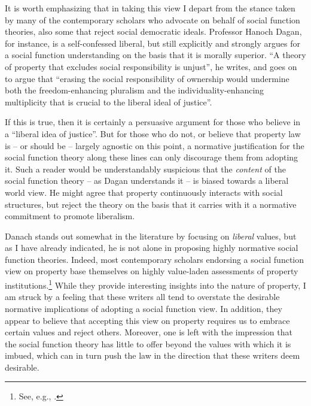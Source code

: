 It is worth emphasizing that in taking this view I depart from the stance taken by many of the contemporary scholars who advocate on behalf of social function theories, also some that reject social democratic ideals. Professor Hanoch Dagan, for instance, is a self-confessed liberal, but still explicitly and strongly argues for a social function understanding on the basis that it is morally superior. ``A theory of property that excludes social responsibility is unjust'', he writes, and goes on to argue that ``erasing the social responsibility of ownership would undermine both the freedom-enhancing pluralism and the individuality-enhancing multiplicity that is crucial to the liberal ideal of justice''.

If this is true, then it is certainly a persuasive argument for those who believe in a ``liberal idea of justice''. But for those who do not, or believe that property law is -- or should be -- largely agnostic on this point, a normative justification for the social function theory along these lines can only discourage them from adopting it. Such a reader would be understandably suspicious that the {\it content} of the social function theory -- as Dagan understands it -- is biased towards a liberal world view. He might agree that property continuously interacts with social structures, but reject the theory on the basis that it carries with it a normative commitment to promote liberalism.

Danach stands out somewhat in the literature by focusing on {\it liberal} values, but as I have already indicated, he is not alone in proposing highly normative social function theories. Indeed, most contemporary scholars endorsing a social function view on property base themselves on highly value-laden assessments of property institutions.\footnote{See, e.g.,  \cite{alexander09,crawford11,davidson11,singer09,penalver09}.} While they provide interesting insights into the nature of property, I am struck by a feeling that these writers all tend to overstate the desirable normative implications of adopting a social function view. In addition, they appear to believe that accepting this view on property requires us to embrace certain values and reject others. Moreover, one is left with the impression that the social function theory has little to offer beyond the values with which it is imbued, which can in turn push the law in the direction that these writers deem desirable. 

